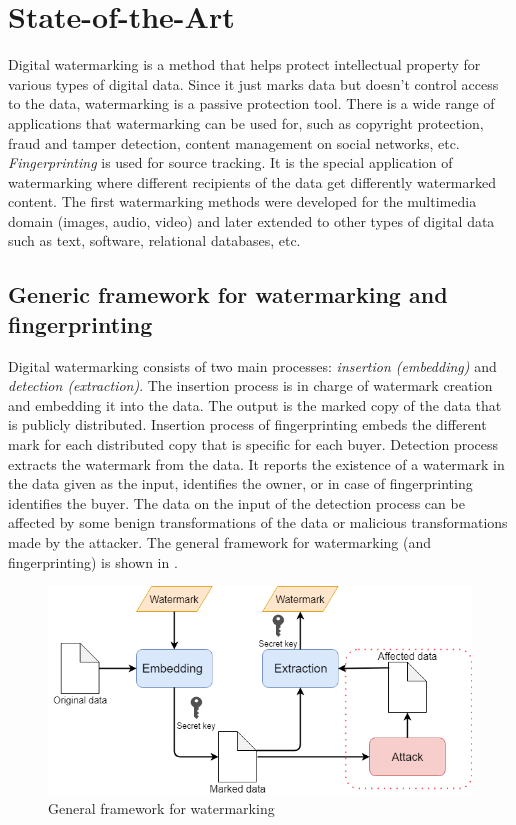 \chapter{State-of-the-Art}\label{sec:State-of-the-art}

Digital watermarking is a method that helps protect intellectual property for various types of digital data. 
Since it just marks data but doesn't control access to the data, watermarking is a passive protection tool.
There is a wide range of applications that watermarking can be used for, such as copyright protection, fraud and tamper detection, content management on social networks, etc. 
\textit{Fingerprinting} is used for source tracking. 
It is the special application of watermarking where different recipients of the data get differently watermarked content.
The first watermarking methods were developed for the multimedia domain (images, audio, video) and later extended to other types of digital data such as text, software, relational databases, etc. 

\section{Generic framework for watermarking and fingerprinting}
Digital watermarking consists of two main processes: \textit{insertion (embedding)} and \textit{detection (extraction)}.
The insertion process is in charge of watermark creation and embedding it into the data. 
The output is the marked copy of the data that is publicly distributed. 
Insertion process of fingerprinting embeds the different mark for each distributed copy that is specific for each buyer.
Detection process extracts the watermark from the data. It reports the existence of a watermark in the data given as the input, identifies the owner, or in case of fingerprinting identifies the buyer. 
The data on the input of the detection process can be affected by some benign transformations of the data or malicious transformations made by the attacker. 
The general framework for watermarking (and fingerprinting) is shown in .

\begin{figure}
    \label{fig:framework}
    \centering
    \includegraphics[width=\textwidth]{Figures/framework.png}
    \caption{General framework for watermarking}
\end{figure}

